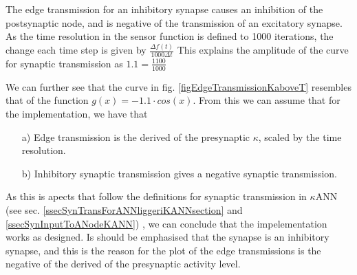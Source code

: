 			The edge transmission for an inhibitory synapse causes an inhibition of the postsynaptic node, and is negative of the transmission of an excitatory synapse.
			As the time resolution in the sensor function is defined to 1000 iterations, the change each time step is given by $\frac{\Delta f(t)}{1000 \Delta t}$
			This explains the amplitude of the curve for synaptic transmission as $1.1 = \frac{1100}{1000}$

			We can further see that the curve in fig. \ref{figEdgeTransmissionKaboveT} resembles that of the function $g(x)= - 1.1 \cdot cos(x)$. 
			From this we can assume that for the implementation, we have that
			\begin{itemize}
				\item[a)] Edge transmission is the derived of the presynaptic $\kappa$, scaled by the time resolution.
				\item[b)] Inhibitory synaptic transmission gives a negative synaptic transmission.
			\end{itemize}
			As this is apects that follow the definitions for synaptic transmission in $\kappa$ANN (see sec. \ref{ssecSynTransForANNliggeriKANNsection} and \ref{ssecSynInputToANodeKANN})
				, we can conclude that the impelementation works as designed.
			Is should be emphasised that the synapse is an inhibitory synapse, and this is the reason for the plot of the edge transmissions is the negative of the derived of the presynaptic activity level.

